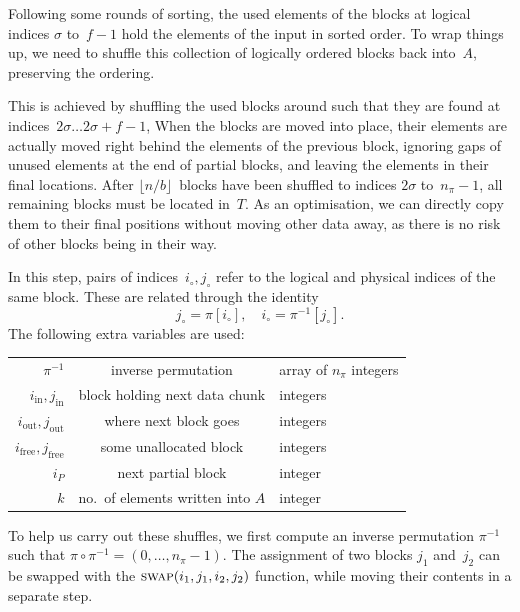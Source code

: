 \documentclass[nolineno,a4paper,UKenglish,cleveref, autoref, thm-restate]{socg-lipics-v2021}
\begin{document}
Following some rounds of sorting, the used elements of the blocks at logical indices $\sigma$ to~$f-1$
hold the elements of the input in sorted order.  To wrap things up, we need to shuffle
this collection of logically ordered blocks back into~$A$, preserving the ordering.

This is achieved by shuffling the used blocks around such that they are found at indices~$2\sigma\ldots 2\sigma+f-1$,
When the blocks are moved into place, their elements
are actually moved right behind the elements of the previous block, ignoring gaps of
unused elements at the end of partial blocks, and leaving the elements in their
final locations.
After $\lfloor n/b\rfloor$~blocks have been shuffled to indices $2\sigma$ to~$n_\pi-1$,
all remaining blocks must be located in~$T$.
As an optimisation, we can directly copy them to their final positions without
moving other data away, as there is no risk of other blocks being in their way.

In this step, pairs of indices~$i_\circ,j_\circ$ refer to the
logical and physical indices of the same block.
These are related through the identity
\begin{equation}
j_\circ=\pi[i_\circ],\quad i_\circ=\pi^{-1}[j_\circ].
\end{equation}
The following extra variables are used:

\vspace{\abovedisplayskip}
\begin{centering}
\begin{tabular}{rcl}
\toprule
$\pi^{-1}$&inverse permutation&array of $n_\pi$ integers\\
$i_{\mathrm{in}}, j_{\mathrm{in}}$&block holding next data chunk&integers\\
$i_{\mathrm{out}}, j_{\mathrm{out}}$&where next block goes&integers\\
$i_{\mathrm{free}}, j_{\mathrm{free}}$&some unallocated block&integers\\
$i_P$&next partial block&integer\\
$k$&no.~of elements written into $A$&integer\\
\bottomrule
\end{tabular}
\vspace{\belowdisplayskip}
\end{centering}

To help us carry out these shuffles, we first compute an inverse permutation $\pi^{-1}$ such
that $\pi\circ\pi^{-1}=(0,\ldots,n_\pi-1)$.  The assignment of two blocks $j_1$ and~$j_2$ can be
swapped with the $\Call{swap}{i_1,j_1,i_2,j_2}$ function, while moving their contents in a separate
step.
\end{document}
